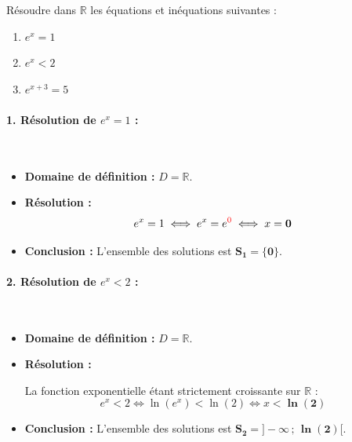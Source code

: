 \documentclass[12pt,a4paper]{article}
\begin{document}
\begin{tcolorbox}[colback=yellow!5!white,colframe=myred,title=\textbf{Exercice d'application}]
Résoudre dans $\mathbb{R}$ les équations et inéquations suivantes :
\begin{enumerate}
    \item $e^x = 1$
    \item $e^x < 2$
    \item $e^{x + 3} = 5$
\end{enumerate}
\end{tcolorbox}

\vspace{0.3cm}

\begin{tcolorbox}[colback=gray!5!white,colframe=myblue,title=\textbf{Correction détaillée}]

\paragraph{1. Résolution de $e^x = 1$ :}\leavevmode\\[2mm]
\begin{itemize}
    \item \textbf{Domaine de définition :} $D = \mathbb{R}$.
    \item \textbf{Résolution :}
    \[
    e^x = 1 \iff e^x = e^{\color{red}0} \iff x = \mathbf{0}
    \]
    \item \textbf{Conclusion :} L'ensemble des solutions est $\mathbf{S_1 = \{0\}}$.
\end{itemize}

\vspace{0.4cm}

\paragraph{2. Résolution de $e^x < 2$ :}\leavevmode\\[2mm]
\begin{itemize}
    \item \textbf{Domaine de définition :} $D = \mathbb{R}$.
    \item \textbf{Résolution :}
    
    La fonction exponentielle étant strictement croissante sur $\mathbb{R}$ :
    \[
    e^x < 2 \iff \ln(e^x) < \ln(2) \iff x < \mathbf{\ln(2)}
    \]
    \item \textbf{Conclusion :} L'ensemble des solutions est $\mathbf{S_2 = ]-\infty \,;\, \ln(2)[}$.
\end{itemize}


\end{tcolorbox}
\end{document}
